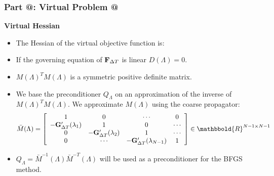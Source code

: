 \documentclass[9pt]{beamer}
\makeatletter
\newcommand*{\rom}[1]{\expandafter\@slowromancap\romannumeral #1@}
\makeatother
\begin{document}
\begin{frame}
\frametitle{\textbf{ Part \rom{4}:} Virtual Problem \rom{2}}
\textbf{Virtual Hessian}
\begin{itemize}
\item{The Hessian of the virtual objective function is:
}
\item<2->{If the governing equation of $\bold F_{\Delta T}$ is linear {\small$D(\Lambda)=0$}.}
\item<3->{$M(\Lambda)^TM(\Lambda)$ is a symmetric positive definite matrix.}
\end{itemize}
\begin{itemize}
\item<4->{We base the preconditioner $Q_{\Lambda}$ on an approximation of the inverse of {$M(\Lambda)^TM(\Lambda)$}. We approximate $M(\Lambda)$ using the coarse propagator:
\begin{align*}
\bar M(\Lambda)= \left[ \begin{array}{cccc}
   1 & 0 & \cdots & 0 \\  
   -\bold{G}_{\Delta T}'(\lambda_{1}) & 1 & 0 & \cdots \\ 
   0 &-\bold{G}_{\Delta T}'(\lambda_{2}) & 1  & \cdots \\
   0 &\cdots &-\bold{G}_{\Delta T}'(\lambda_{N-1}) & 1  \\
   \end{array}  \right]\in\mathbbold{R}^{N-1\times N-1}
\end{align*}}
\item<5->{$Q_{\Lambda}=\bar{M}^{-1}(\Lambda)\bar{M}^{-T}(\Lambda)$ will be used as a preconditioner for the BFGS method.}
\end{itemize}
\end{frame}
\end{document}
